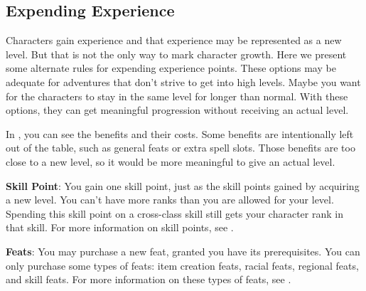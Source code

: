 \subsection{Expending Experience}
Characters gain experience and that experience may be represented as a new level. But that is not the only way to mark character growth. Here we present some alternate rules for expending experience points. These options may be adequate for adventures that don't strive to get into high levels. Maybe you want for the characters to stay in the same level for longer than normal. With these options, they can get meaningful progression without receiving an actual level.

In , you can see the benefits and their costs. Some benefits are intentionally left out of the table, such as general feats or extra spell slots. Those benefits are too close to a new level, so it would be more meaningful to give an actual level.


\textbf{Skill Point}: You gain one skill point, just as the skill points gained by acquiring a new level. You can't have more ranks than you are allowed for your level. Spending this skill point on a cross-class skill still gets your character \onehalf rank in that skill. For more information on skill points, see .

\textbf{Feats}: You may purchase a new feat, granted you have its prerequisites. You can only purchase some types of feats: item creation feats, racial feats, regional feats, and skill feats. For more information on these types of feats, see .

